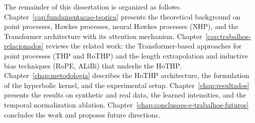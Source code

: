 The remainder of this dissertation is organized as follows. Chapter~\ref{cap:fundamentacao-teorica} presents the theoretical background on point processes, Hawkes processes, neural Hawkes processes (NHP), and the Transformer architecture with its attention mechanism. Chapter~\ref{cap:trabalhos-relacionados} reviews the related work: the Transformer-based approaches for point processes (THP and RoTHP) and the length extrapolation and inductive bias techniques (RoPE, ALiBi) that underlie the HoTHP. Chapter~\ref{chap:metodologia} describes the HoTHP architecture, the formulation of the hyperbolic kernel, and the experimental setup. Chapter~\ref{chap:resultados} presents the results on synthetic and real data, the learned intensities, and the temporal normalization ablation. Chapter~\ref{chap:conclusoes-e-trabalhos-futuros} concludes the work and proposes future directions.
